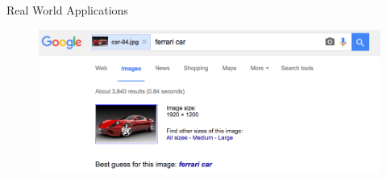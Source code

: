\documentclass{beamer}
\begin{document}
    \begin{frame}{Real World Applications}

      \begin{figure}
        \par\medskip
        \includegraphics[scale=0.3]{images/slides/google_query_image.png}
      \end{figure}

    \end{frame}
\end{document}
